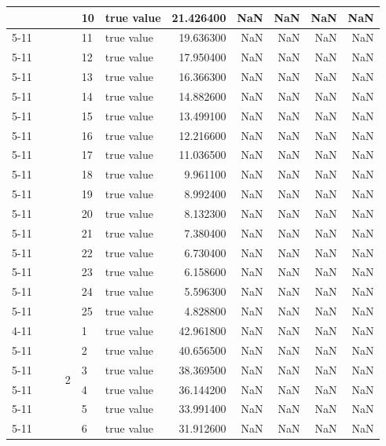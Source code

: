 \begin{tabular}{llllllrrrrr}
 &  &  &  & 10 & true value & 21.426400 & NaN & NaN & NaN & NaN \\
\cline{5-11}
 &  &  &  & 11 & true value & 19.636300 & NaN & NaN & NaN & NaN \\
\cline{5-11}
 &  &  &  & 12 & true value & 17.950400 & NaN & NaN & NaN & NaN \\
\cline{5-11}
 &  &  &  & 13 & true value & 16.366300 & NaN & NaN & NaN & NaN \\
\cline{5-11}
 &  &  &  & 14 & true value & 14.882600 & NaN & NaN & NaN & NaN \\
\cline{5-11}
 &  &  &  & 15 & true value & 13.499100 & NaN & NaN & NaN & NaN \\
\cline{5-11}
 &  &  &  & 16 & true value & 12.216600 & NaN & NaN & NaN & NaN \\
\cline{5-11}
 &  &  &  & 17 & true value & 11.036500 & NaN & NaN & NaN & NaN \\
\cline{5-11}
 &  &  &  & 18 & true value & 9.961100 & NaN & NaN & NaN & NaN \\
\cline{5-11}
 &  &  &  & 19 & true value & 8.992400 & NaN & NaN & NaN & NaN \\
\cline{5-11}
 &  &  &  & 20 & true value & 8.132300 & NaN & NaN & NaN & NaN \\
\cline{5-11}
 &  &  &  & 21 & true value & 7.380400 & NaN & NaN & NaN & NaN \\
\cline{5-11}
 &  &  &  & 22 & true value & 6.730400 & NaN & NaN & NaN & NaN \\
\cline{5-11}
 &  &  &  & 23 & true value & 6.158600 & NaN & NaN & NaN & NaN \\
\cline{5-11}
 &  &  &  & 24 & true value & 5.596300 & NaN & NaN & NaN & NaN \\
\cline{5-11}
 &  &  &  & 25 & true value & 4.828800 & NaN & NaN & NaN & NaN \\
\cline{4-11} \cline{5-11}
 &  &  & \multirow[t]{25}{*}{2} & 1 & true value & 42.961800 & NaN & NaN & NaN & NaN \\
\cline{5-11}
 &  &  &  & 2 & true value & 40.656500 & NaN & NaN & NaN & NaN \\
\cline{5-11}
 &  &  &  & 3 & true value & 38.369500 & NaN & NaN & NaN & NaN \\
\cline{5-11}
 &  &  &  & 4 & true value & 36.144200 & NaN & NaN & NaN & NaN \\
\cline{5-11}
 &  &  &  & 5 & true value & 33.991400 & NaN & NaN & NaN & NaN \\
\cline{5-11}
 &  &  &  & 6 & true value & 31.912600 & NaN & NaN & NaN & NaN \\

\end{tabular}
